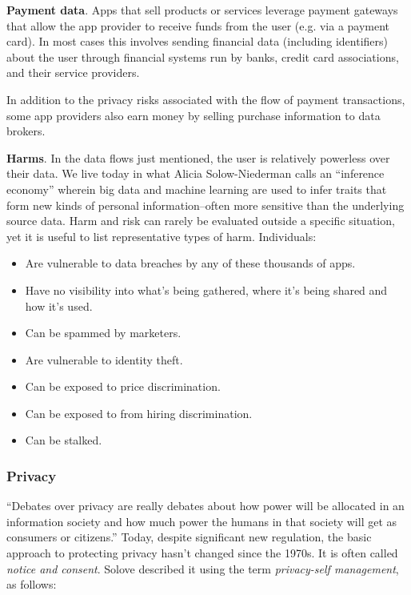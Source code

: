 \documentclass[11pt, oneside]{article}   	%
\begin{document}
\textbf{Payment data}. Apps that sell products or services leverage payment gateways that allow the app provider to receive funds from the user (e.g. via a payment card). In most cases this involves sending financial data (including identifiers) about the user through financial systems run by banks, credit card associations, and their service providers.

In addition to the privacy risks associated with the flow of payment transactions, some app providers also earn money by selling purchase information to data brokers.

\textbf{Harms}. In the data flows just mentioned, the user is relatively powerless over their data. We live today in what Alicia Solow-Niederman calls an ``inference economy''\cite{Solow-Niederman2022} wherein big data and machine learning are used to infer traits that form new kinds of personal information--often more sensitive than the underlying source data. Harm and risk can rarely be evaluated outside a specific situation\cite{Solove2023}, yet it is useful to list representative types of harm. Individuals:

\begin{itemize}
	\item Are vulnerable to data breaches by any of these thousands of apps.
	\item Have no visibility into what's being gathered, where it's being shared and how it's used.
	\item Can be spammed by marketers.
	\item Are vulnerable to identity theft.
	\item Can be exposed to price discrimination.
	\item Can be exposed to from hiring discrimination.
	\item Can be stalked.
\end{itemize}

\subsubsection{Privacy}

``Debates over privacy are really debates about how power will be allocated in an information society and how much power the humans in that society will get as consumers or citizens.''\cite{Richards2021} Today, despite significant new regulation, the basic approach to protecting privacy hasn't changed since the 1970s. It is often called \emph{notice and consent}. Solove described it using the term \emph{privacy-self management}, as follows:
\end{document}
